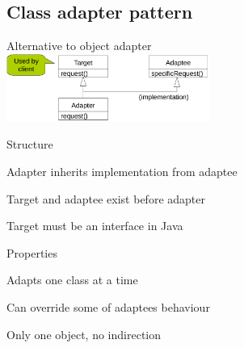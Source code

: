 \documentclass[10pt]{article}
\begin{document}
\subsection{Class adapter pattern}
\enumstart
	\item Alternative to object adapter
	\\ \includegraphics[width=0.5\textwidth]{class_adapter_pattern.png}
	\item Structure
	\enumstart
		\item Adapter inherits implementation from adaptee
		\item Target and adaptee exist before adapter
		\item Target must be an interface in Java
	\enumend
	\item Properties
	\enumstart
		\item Adapts one class at a time
		\item Can override some of adaptees behaviour
		\item Only one object, no indirection
	\enumend
\enumend
\end{document}
